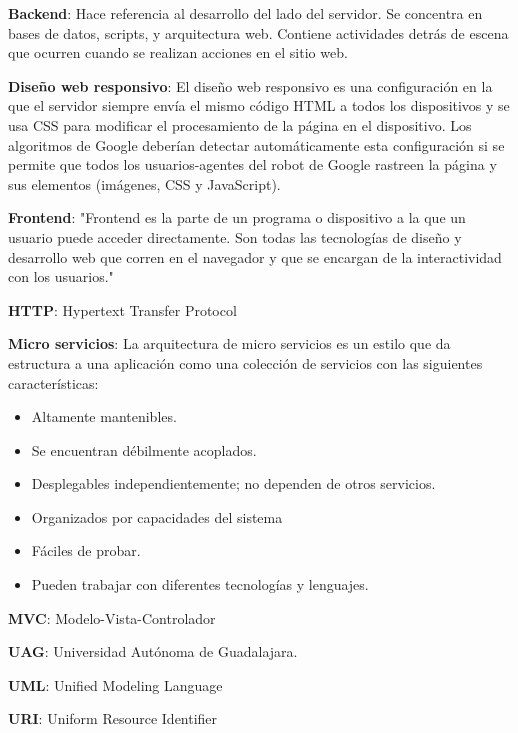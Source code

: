     \textbf{Backend}: Hace referencia al desarrollo del lado del servidor. Se concentra en bases de datos, scripts, y arquitectura web. Contiene actividades detrás de escena que ocurren cuando se realizan acciones en el sitio web. \cite{Backend}

    \textbf{Diseño web responsivo}: El diseño web responsivo es una configuración en la que el servidor siempre envía el mismo código HTML a todos los dispositivos y se usa CSS para modificar el procesamiento de la página en el dispositivo. Los algoritmos de Google deberían detectar automáticamente esta configuración si se permite que todos los usuarios-agentes del robot de Google rastreen la página y sus elementos (imágenes, CSS y JavaScript). \cite{GoogleResponsivo}
    
    \textbf{Frontend}: "Frontend es la parte de un programa o dispositivo a la que un usuario puede acceder directamente. Son todas las tecnologías de diseño y desarrollo web que corren en el navegador y que se encargan de la interactividad con los usuarios."\cite{Frontend}
    
    \textbf{HTTP}: Hypertext Transfer Protocol
    
    \textbf{Micro servicios}: La arquitectura de micro servicios es un estilo que da estructura a una aplicación como una colección de servicios con las siguientes características\cite{richards2020fundamentals}:
    
    \begin{itemize}
        \item Altamente mantenibles.
        \item Se encuentran débilmente acoplados.
        \item Desplegables independientemente; no dependen de otros servicios.
        \item Organizados por capacidades del sistema
        \item Fáciles de probar.
        \item Pueden trabajar con diferentes tecnologías y lenguajes.
    \end{itemize}
    
    \textbf{MVC}: Modelo-Vista-Controlador
    
    \textbf{UAG}: Universidad Autónoma de Guadalajara.
    
    \textbf{UML}: Unified Modeling Language
    
    \textbf{URI}: Uniform Resource Identifier